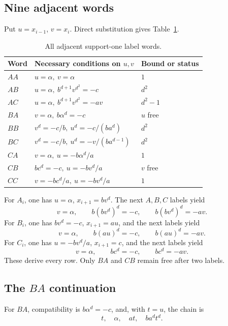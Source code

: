 \documentclass[11pt]{article}
\theoremstyle{definition}
\begin{document}
\subsection{Nine adjacent words}

Put \(u=x_{i-1}\), \(v=x_i\). Direct substitution gives Table~\ref{tab:nine-words}.

\begin{table}[t]
\centering
\small
\caption{All adjacent support-one label words.}
\label{tab:nine-words}
\begin{tabularx}{\textwidth}{@{}l X l@{}}
\toprule
Word & Necessary conditions on \(u,v\) & Bound or status\\
\midrule
\(AA\) & \(u=\alpha,\ v=\alpha\) & \(1\)\\
\(AB\) & \(u=\alpha,\ b^{d+1}v^{d^2}=-c\) & \(d^2\)\\
\(AC\) & \(u=\alpha,\ b^{d+1}v^{d^2}=-av\) & \(d^2-1\)\\
\(BA\) & \(v=\alpha,\ b\alpha^d=-c\) & \(u\) free\\
\(BB\) & \(v^d=-c/b,\ u^d=-c/(ba^d)\) & \(d^2\)\\
\(BC\) & \(v^d=-c/b,\ u^d=-v/(ba^{d-1})\) & \(d^2\)\\
\(CA\) & \(v=\alpha,\ u=-b\alpha^d/a\) & \(1\)\\
\(CB\) & \(bc^d=-c,\ u=-bv^d/a\) & \(v\) free\\
\(CC\) & \(v=-bc^d/a,\ u=-bv^d/a\) & \(1\)\\
\bottomrule
\end{tabularx}
\end{table}

For \(A_i\), one has \(u=\alpha\), \(x_{i+1}=bv^d\). The next \(A,B,C\) labels yield
\[
 v=\alpha,\qquad b(bv^d)^d=-c,\qquad b(bv^d)^d=-av.
\]
For \(B_i\), one has \(bv^d=-c\), \(x_{i+1}=au\), and the next labels yield
\[
 v=\alpha,\qquad b(au)^d=-c,\qquad b(au)^d=-av.
\]
For \(C_i\), one has \(u=-bv^d/a\), \(x_{i+1}=c\), and the next labels yield
\[
 v=\alpha,\qquad bc^d=-c,\qquad bc^d=-av.
\]
These derive every row. Only \(BA\) and \(CB\) remain free after two labels.

\subsection{The \texorpdfstring{\(BA\)}{BA} continuation}

For \(BA\), compatibility is \(b\alpha^d=-c\), and, with \(t=u\), the chain is
\begin{equation}
 t,\quad\alpha,\quad at,\quad ba^dt^d.
 \label{eq:BA-chain}
\end{equation}
\end{document}
